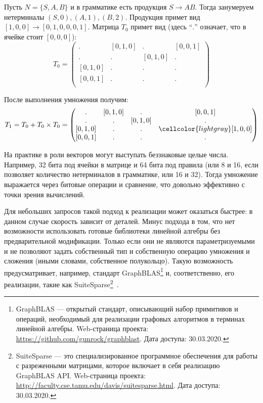 \begin{example}
Пусть $N = \{S, A, B\}$ и в грамматике есть продукция $S \to A B$. Тогда занумеруем нетерминалы $ (S, 0), (A, 1), (B, 2)$. Продукция примет вид $[1, 0, 0] \to [0, 1, 0, 0, 0, 1]$. Матрица $T_0$ примет вид (здесь ``$.$'' означает, что в ячейке стоит $[0,0,0]$):
\[
T_0 = \begin{pmatrix}
. & [0,1,0]       & . & [0,0,1]       \\
. & . & [0,1,0]       & . \\
[0,1,0]       & . & . & . \\
[0,0,1]      & . & . & . \\
\end{pmatrix}
\]

После выполнения умножения получим:
\[
T_1 = T_0 + T_0 \times T_0 =
\begin{pmatrix}
. & [0,1,0]       & . & [0,0,1]       \\
. & . & [0,1,0]       & . \\
[0,1,0]       & . & . & \cellcolor{lightgray}[1,0,0] \\
[0,0,1]      & . & . & . \\
\end{pmatrix}
\]
\end{example}


На практике в роли векторов могут выступать беззнаковые целые числа.
Например, 32 бита под ячейки в матрице и 64 бита под правила (или 8 и 16, если позволяет количество нетерминалов в грамматике, или 16 и 32).
Тогда умножение выражается через битовые операции и сравнение, что довольно эффективно с точки зрения вычислений.

Для небольших запросов такой подход к реализации может оказаться быстрее: в данном случае скорость зависит от деталей.
Минус подхода в том, что нет возможности использовать готовые библиотеки линейной алгебры без предварительной модификации.
Только если они не являются параметризуемыми и не позволяют задать собственный тип и собственную операцию умножения и сложения (иными словами, собственное полукольцо).
Такую возможность предусматривает, например, стандарт GraphBLAS\footnote{GraphBLAS --- открытый стандарт, описывающий набор примитивов и операций, необходимый для реализации графовых алгоритмов в терминах линейной алгебры. Web-страница проекта: \url{https://github.com/gunrock/graphblast}. Дата доступа: 30.03.2020.} и, соответственно, его реализации, такие как SuiteSparse\footnote{SuiteSparse --- это специализированное программное обеспечения для работы с разреженными матрицами, которое включает в себя реализацию GraphBLAS API. Web-страница проекта: \url{http://faculty.cse.tamu.edu/davis/suitesparse.html}. Дата доступа: 30.03.2020.}~\cite{Davis2018Algorithm9S}.


